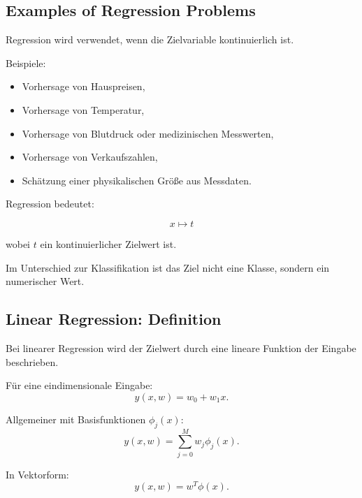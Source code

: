 \documentclass[11pt,a4paper]{scrartcl}
\begin{document}
\subsection{Examples of Regression Problems}

\begin{notebox}
    Regression wird verwendet, wenn die Zielvariable kontinuierlich ist.

    Beispiele:

    \begin{itemize}
        \item Vorhersage von Hauspreisen,
        \item Vorhersage von Temperatur,
        \item Vorhersage von Blutdruck oder medizinischen Messwerten,
        \item Vorhersage von Verkaufszahlen,
        \item Schätzung einer physikalischen Größe aus Messdaten.
    \end{itemize}
\end{notebox}

\begin{answerbox}
    Regression bedeutet:

    \[
        \boxed{
            x \longmapsto t
        }
    \]

    wobei \(t\) ein kontinuierlicher Zielwert ist.

    Im Unterschied zur Klassifikation ist das Ziel nicht eine Klasse, sondern
    ein numerischer Wert.
\end{answerbox}

\subsection{Linear Regression: Definition}

\begin{notebox}
    Bei linearer Regression wird der Zielwert durch eine lineare Funktion der
    Eingabe beschrieben.

    Für eine eindimensionale Eingabe:
    \[
        y(x,w)
        =
        w_0 + w_1x.
    \]

    Allgemeiner mit Basisfunktionen \(\phi_j(x)\):
    \[
        y(x,w)
        =
        \sum_{j=0}^{M}
        w_j \phi_j(x).
    \]

    In Vektorform:
    \[
        y(x,w)
        =
        w^T\phi(x).
    \]
\end{notebox}
\end{document}
